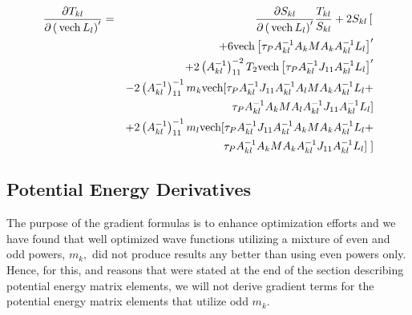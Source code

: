 \documentclass[12pt,doublespace]{article}
\begin{document}
\begin{eqnarray}
\frac{\partial T_{kl}}{\partial \left( \,\mathrm{vech}\,L_{l}\right)
^{\prime }} &=&\frac{\partial S_{kl}}{\partial \left( \,\mathrm{vech}%
\,L_{l}\right) ^{\prime }}\frac{T_{kl}}{S_{kl}}+2S_{kl}\left[ 
\begin{array}{c}
\end{array}
\right.   \notag \\
&&+6\mathrm{vech}\left[ \tau _{P}A_{kl}^{-1}A_{k}MA_{k}A_{kl}^{-1}L_{l}%
\right] ^{\prime }  \notag \\
&&+2\left( A_{kl}^{-1}\right) _{11}^{-2}T_{2}\mathrm{vech}\left[ \tau
_{P}A_{kl}^{-1}J_{11}A_{kl}^{-1}L_{l}\right] ^{\prime }  \notag \\
&&-2\left( A_{kl}^{-1}\right) _{11}^{-1}m_{k}\mathrm{vech[}\tau
_{P}A_{kl}^{-1}J_{11}A_{kl}^{-1}A_{l}MA_{k}A_{kl}^{-1}L_{l}+  \notag \\
&&\quad \quad \quad \,\quad \tau
_{P}A_{kl}^{-1}A_{k}MA_{l}A_{kl}^{-1}J_{11}A_{kl}^{-1}L_{l}]  \notag \\
&&+2\left( A_{kl}^{-1}\right) _{11}^{-1}m_{l}\mathrm{vech[}\tau
_{P}A_{kl}^{-1}J_{11}A_{kl}^{-1}A_{k}MA_{k}A_{kl}^{-1}L_{l}+  \notag \\
&&\quad \quad \quad \quad \tau
_{P}A_{kl}^{-1}A_{k}MA_{k}A_{kl}^{-1}J_{11}A_{kl}^{-1}L_{l}]\left. 
\begin{array}{c}
\end{array}
\right] 
\end{eqnarray}

\subsection{Potential Energy Derivatives}

The purpose of the gradient formulas is to enhance optimization efforts and
we have found that well optimized wave functions utilizing a mixture of even
and odd powers, $m_{k},$ did not produce results any better than using even
powers only. Hence, for this, and reasons that were stated at the end of the
section describing potential energy matrix elements, we will not derive
gradient terms for the potential energy matrix elements that utilize odd $%
m_{k}.$
\end{document}
